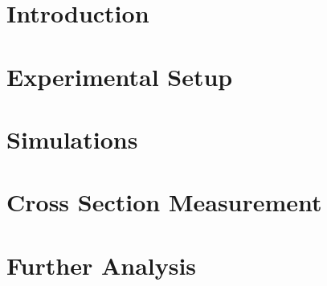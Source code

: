 \documentclass[12pt,twoside]{mitthesis}
\begin{document}

% 
\pagestyle{plain}
\tableofcontents
{}




\chapter{Introduction} \label{Chapter:Intro}




\chapter{Experimental Setup} \label{Chapter:Experiment}


\chapter{Simulations} \label{Chapter:Simulations}


\chapter{Cross Section Measurement} \label{Chapter:BaseAnalysis}


\chapter{Further Analysis} \label{Chapter:Further Analysis}







\appendix


\end{document}
